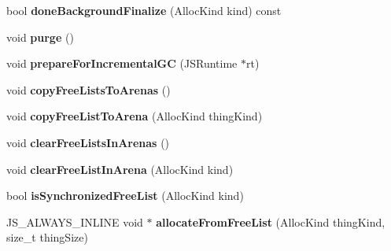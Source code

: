 \begin{DoxyCompactItemize}
\item 
\hypertarget{structjs_1_1gc_1_1_arena_lists_a7be86b2cc9624c3a2b519752372aaaa9}{bool {\bfseries done\-Background\-Finalize} (Alloc\-Kind kind) const }\label{structjs_1_1gc_1_1_arena_lists_a7be86b2cc9624c3a2b519752372aaaa9}

\item 
\hypertarget{structjs_1_1gc_1_1_arena_lists_abe9db02a56fd383692386ac2d1626f7d}{void {\bfseries purge} ()}\label{structjs_1_1gc_1_1_arena_lists_abe9db02a56fd383692386ac2d1626f7d}

\item 
\hypertarget{structjs_1_1gc_1_1_arena_lists_a871ebcefdb8e7b132425dba64672403d}{void {\bfseries prepare\-For\-Incremental\-G\-C} (J\-S\-Runtime $\ast$rt)}\label{structjs_1_1gc_1_1_arena_lists_a871ebcefdb8e7b132425dba64672403d}

\item 
\hypertarget{structjs_1_1gc_1_1_arena_lists_a0cba850c836757320f85a8b8b61766b8}{void {\bfseries copy\-Free\-Lists\-To\-Arenas} ()}\label{structjs_1_1gc_1_1_arena_lists_a0cba850c836757320f85a8b8b61766b8}

\item 
\hypertarget{structjs_1_1gc_1_1_arena_lists_af4da0e80177f24ec63e773e26b3fffb5}{void {\bfseries copy\-Free\-List\-To\-Arena} (Alloc\-Kind thing\-Kind)}\label{structjs_1_1gc_1_1_arena_lists_af4da0e80177f24ec63e773e26b3fffb5}

\item 
\hypertarget{structjs_1_1gc_1_1_arena_lists_a89729b461c0c076aa213235a0362ce43}{void {\bfseries clear\-Free\-Lists\-In\-Arenas} ()}\label{structjs_1_1gc_1_1_arena_lists_a89729b461c0c076aa213235a0362ce43}

\item 
\hypertarget{structjs_1_1gc_1_1_arena_lists_a5665416dfa4fcbe193875a3d5b97104b}{void {\bfseries clear\-Free\-List\-In\-Arena} (Alloc\-Kind kind)}\label{structjs_1_1gc_1_1_arena_lists_a5665416dfa4fcbe193875a3d5b97104b}

\item 
\hypertarget{structjs_1_1gc_1_1_arena_lists_abfa459afb496d3a933aae30b61bf144a}{bool {\bfseries is\-Synchronized\-Free\-List} (Alloc\-Kind kind)}\label{structjs_1_1gc_1_1_arena_lists_abfa459afb496d3a933aae30b61bf144a}

\item 
\hypertarget{structjs_1_1gc_1_1_arena_lists_a5e5068c5bf938fa0d353357346f8f813}{J\-S\-\_\-\-A\-L\-W\-A\-Y\-S\-\_\-\-I\-N\-L\-I\-N\-E void $\ast$ {\bfseries allocate\-From\-Free\-List} (Alloc\-Kind thing\-Kind, size\-\_\-t thing\-Size)}\label{structjs_1_1gc_1_1_arena_lists_a5e5068c5bf938fa0d353357346f8f813}


\end{DoxyCompactItemize}
